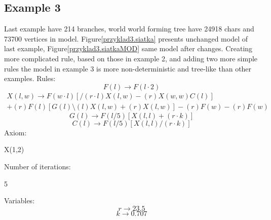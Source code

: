 \documentclass[b5paper,twoside,11pt]{article}
\renewcommand{\figurename}{Figure}
\begin{document}
\subsection*{Example 3}
Last example have 214 branches, world world forming tree have 24918 chars and 73700 vertices in model. 
\figurename \ref{przyklad3.siatka} presents unchanged model of last example, \figurename \ref{przyklad3.siatkaMOD} same model after changes. Creating more complicated rule, based on those in example 2, and adding two more simple rules the model in example 3 is more non-deterministic and tree-like than other examples.
Rules: \newline
\begin{equation}
F(l)\rightarrow F(l\cdot2) 
\end{equation}
\begin{multline*}
X(l,w) \rightarrow F(w\cdot l)[/(r\cdot l)X(l,w)-(r)X(w,w)C(l)]\\
+(r)F(l)[G(l)\setminus(l)X(l,w)+(r)X(l,w)]-(r)F(w)-(r)F(w)
\end{multline*}
\begin{equation}
G(l) \rightarrow F(l/5)[X(l,l)+(r\cdot k)]
\end{equation}
\begin{equation}
C(l) \rightarrow F(l/5)[X(l,l)/(r\cdot k)]
\end{equation}
Axiom:
\begin{center}
X(1,2)
\end{center}
Number of iterations:
\begin{center}
5
\end{center}
Variables:
\begin{equation}
r\rightarrow 23.5
\end{equation}
\begin{equation}
k\rightarrow 0.707
\end{equation}
\end{document}
